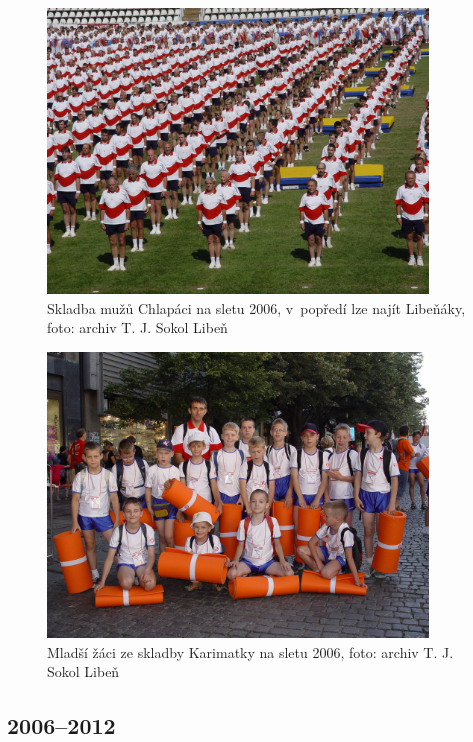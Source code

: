\documentclass[a5paper, 11pt, twoside]{article}
\begin{document}
\begin{figure}[h]
  \centering 
  \includegraphics[width=0.9\textwidth]{img/55_chalpaci.JPG}
  \caption*{Skladba mužů Chlapáci na sletu 2006, v~popředí lze najít Libeňáky,
  foto: archiv T. J. Sokol Libeň}
\end{figure}

\begin{figure}[h]
  \centering 
  \includegraphics[width=0.9\textwidth]{img/56_karimatky.JPG}
  \caption*{Mladší žáci ze skladby Karimatky na sletu 2006, foto: archiv T. J.
  Sokol Libeň}
\end{figure}


\clearpage
\subsection{2006--2012}
\end{document}

